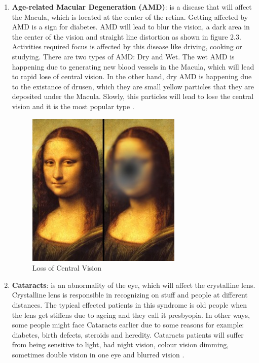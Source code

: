 \begin{enumerate}
\item \textbf{Age-related Macular Degeneration (AMD)}: is a disease that will affect the Macula, which is located at the center of the retina.
Getting affected by AMD is a sign for diabetes.
AMD will lead to blur the vision, a dark area in the center of the vision and straight line distortion as shown in figure 2.3.
Activities required focus is affected by this disease like driving, cooking or studying.
There are two types of AMD: Dry and Wet. 
The wet AMD is happening due to generating new blood vessels in the Macula, which will lead to rapid lose of central vision.
In the other hand, dry AMD is happening due to the existance of drusen, which they are small yellow particles that they are deposited under the Macula.
Slowly, this particles will lead to lose the central vision and it is the most popular type \cite{bressler1988age}.
 
\begin{figure}[htb]
        \centering
        \includegraphics[width = 0.7\textwidth]{figures/Centralloss.jpg} %
  \caption{Loss of Central Vision \cite{centralloss}}
  \label{fig:Central Loss}
\end{figure}  
\item \textbf{Cataracts}: is an abnormality of the eye, which will affect the crystalline lens.
Crystalline lens is responsible in recognizing on stuff and people at different distances.
The typical effected patients in this syndrome is old people when the lens get stiffens due to ageing and they call it presbyopia.
In other ways, some people might face Cataracts earlier due to some reasons for example: diabetes, birth defects, steroids and heredity.
Cataracts patients will suffer from being sensitive to light, bad night vision, colour vision dimming, sometimes double vision in one eye and blurred vision \cite{klein1982cataracts}.
   

\end{enumerate}
